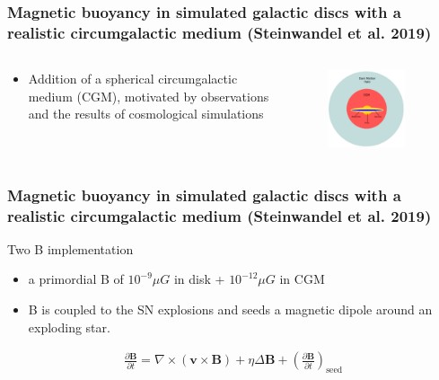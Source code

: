 \documentclass[10pt,aspectratio=169]{beamer}
\begin{document}
\begin{frame}
	\frametitle{Magnetic buoyancy in simulated galactic discs with a realistic circumgalactic medium (Steinwandel et al. 2019)}
	\begin{columns}
		\begin{column}{0.6\textwidth}
			\begin{itemize}
				\item Addition of a spherical circumgalactic medium (CGM), motivated by observations and the results of cosmological simulations
			\end{itemize}
		\end{column}
		\begin{column}{0.38\textwidth}
			\begin{figure}
				\begin{center}
					\includegraphics[width=0.8\textwidth]{./images/Steinwandel2020_galaxy_model.png}
				\end{center}
			\end{figure}
		\end{column}
	\end{columns}
\end{frame}
\begin{frame}
	\frametitle{Magnetic buoyancy in simulated galactic discs with a realistic circumgalactic medium (Steinwandel et al. 2019)}
	Two B implementation
	\begin{itemize}
		\item a primordial B of $10^{-9} \mu G$ in disk + $10^{-12} \mu G$ in CGM
		\item B is coupled to the SN explosions and seeds a magnetic dipole around an exploding star.
	\end{itemize}
	\begin{align}
	\frac{\partial \mathbf{B}}{\partial t} = \nabla \times \left( \mathbf{v} \times \mathbf{B} \right) +\eta \Delta \mathbf{B} + \left(\frac{\partial \mathbf{B}}{\partial t}\right)_\mathrm{seed}
	\end{align}
\end{frame}
\end{document}

